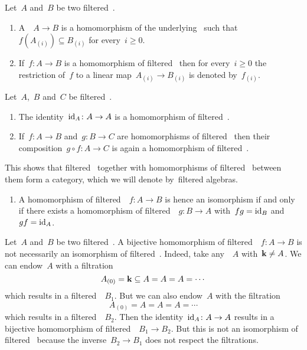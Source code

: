 \begin{definition}
  Let~$A$ and~$B$ be two filtered~\algebras{$\kf$}.
  \begin{enumerate}
    \item
      A~~$A \to B$ is a homomorphism of the underlying~{\algebras{$\kf$}} such that~$f(A_{(i)}) \subseteq B_{(i)}$ for every~$i \geq 0$.
    \item
      If~$f \colon A \to B$ is a homomorphism of filtered~{\algebras{$\kf$}} then for every~$i \geq 0$ the restriction of~$f$ to a linear map~$A_{(i)} \to B_{(i)}$ is denoted by~$f_{(i)}$.
  \end{enumerate}
\end{definition}


\begin{remark}
  Let~$A$,~$B$ and~$C$ be filtered~\algebras{$\kf$}.
  \begin{enumerate}
    \item
      The identity~$\operatorname{id}_A \colon A \to A$ is a homomorphism of filtered~\algebras{$\kf$}.
    \item
      If~$f \colon A \to B$ and~$g \colon B \to C$ are homomorphisms of filtered~\algebras{$\kf$} then their composition~$g \circ f \colon A \to C$ is again a homomorphism of filtered~\algebras{$\kf$}.
  \end{enumerate}
  This shows that filtered~\algebras{$\kf$} together with homomorphisms of filtered~\algebras{$\kf$} between them form a category, which we will denote by~\gls*{filtered algebras}.
  \begin{enumerate}[start=3]
    \item
      A homomorphism of filtered~{\algebras{$\kf$}}~$f \colon A \to B$ is hence an isomorphism if and only if there exists a homomorphism of filtered~{\algebras{$\kf$}}~$g \colon B \to A$ with~$fg = \operatorname{id}_B$ and~$gf = \operatorname{id}_A$.
  \end{enumerate}
\end{remark}


\begin{warning}
  Let~$A$ and~$B$ be two filtered~{\algebras{$\kf$}}.
  A bijective homomorphism of filtered~{\algebras{$\kf$}}~$f \colon A \to B$ is not necessarily an isomorphism of filtered~{\algebras{$\kf$}}.
  Indeed, take any~{\algebra{$\kf$}}~$A$ with~$\mathbf{k} \neq A$.
  We can endow~$A$ with a filtration
  \[
    A_{(0)}
    =
    \mathbf{k}
    \subseteq
    A
    =
    A
    =
    A
    =
    \dotsb
  \]
  which results in a filtered~{\algebra{$\kf$}}~$B_1$.
  But we can also endow~$A$ with the filtration
  \[
    A_{(0)}
    =
    A
    =
    A
    =
    A
    =
    \dotsb
  \]
  which results in a filtered~{\algebra{$\kf$}}~$B_2$.
  Then the identity~$\operatorname{id}_A \colon A \to A$  results in a bijective homomorphism of filtered~{\algebras{$\kf$}}~$B_1 \to B_2$.
  But this is not an isomorphism of filtered~{\algebras{$\kf$}} because the inverse~$B_2 \to B_1$ does not respect the filtrations.
\end{warning}


